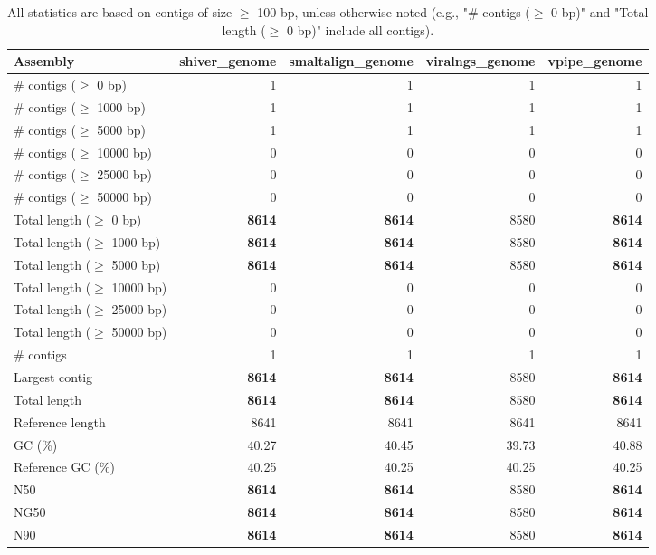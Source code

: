\documentclass[12pt,a4paper]{article}
\begin{document}
\begin{table}[ht]
\begin{center}
\caption{All statistics are based on contigs of size $\geq$ 100 bp, unless otherwise noted (e.g., "\# contigs ($\geq$ 0 bp)" and "Total length ($\geq$ 0 bp)" include all contigs).}
\begin{tabular}{|l*{4}{|r}|}
\hline
Assembly & shiver\_genome & smaltalign\_genome & viralngs\_genome & vpipe\_genome \\ \hline
\# contigs ($\geq$ 0 bp) & 1 & 1 & 1 & 1 \\ \hline
\# contigs ($\geq$ 1000 bp) & 1 & 1 & 1 & 1 \\ \hline
\# contigs ($\geq$ 5000 bp) & 1 & 1 & 1 & 1 \\ \hline
\# contigs ($\geq$ 10000 bp) & 0 & 0 & 0 & 0 \\ \hline
\# contigs ($\geq$ 25000 bp) & 0 & 0 & 0 & 0 \\ \hline
\# contigs ($\geq$ 50000 bp) & 0 & 0 & 0 & 0 \\ \hline
Total length ($\geq$ 0 bp) & {\bf 8614} & {\bf 8614} & 8580 & {\bf 8614} \\ \hline
Total length ($\geq$ 1000 bp) & {\bf 8614} & {\bf 8614} & 8580 & {\bf 8614} \\ \hline
Total length ($\geq$ 5000 bp) & {\bf 8614} & {\bf 8614} & 8580 & {\bf 8614} \\ \hline
Total length ($\geq$ 10000 bp) & 0 & 0 & 0 & 0 \\ \hline
Total length ($\geq$ 25000 bp) & 0 & 0 & 0 & 0 \\ \hline
Total length ($\geq$ 50000 bp) & 0 & 0 & 0 & 0 \\ \hline
\# contigs & 1 & 1 & 1 & 1 \\ \hline
Largest contig & {\bf 8614} & {\bf 8614} & 8580 & {\bf 8614} \\ \hline
Total length & {\bf 8614} & {\bf 8614} & 8580 & {\bf 8614} \\ \hline
Reference length & 8641 & 8641 & 8641 & 8641 \\ \hline
GC (\%) & 40.27 & 40.45 & 39.73 & 40.88 \\ \hline
Reference GC (\%) & 40.25 & 40.25 & 40.25 & 40.25 \\ \hline
N50 & {\bf 8614} & {\bf 8614} & 8580 & {\bf 8614} \\ \hline
NG50 & {\bf 8614} & {\bf 8614} & 8580 & {\bf 8614} \\ \hline
N90 & {\bf 8614} & {\bf 8614} & 8580 & {\bf 8614} \\ \hline

\end{tabular}
\end{center}
\end{table}
\end{document}
